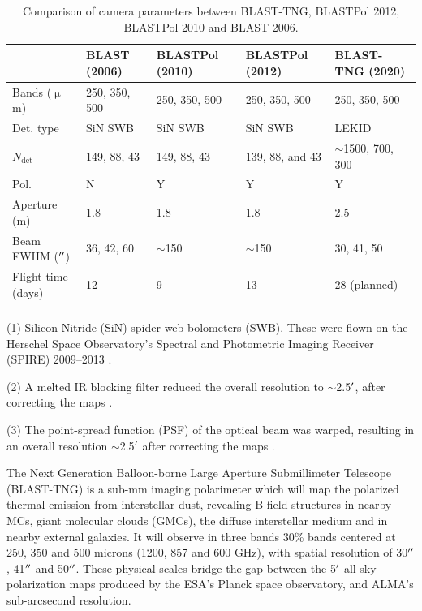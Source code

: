{\begin{table}
\begin{threeparttable}
\centering
\begin{adjustbox}{width=\textwidth}
\begin{tabular}{@{}lllll@{}}
\dtoprule
 & BLAST (2006) & BLASTPol (2010) & BLASTPol (2012) & BLAST-TNG (2020) \\ \midrule
Bands ($\upmu$m) & 250, 350, 500 & 250, 350, 500 & 250, 350, 500 & 250, 350, 500 \\
Det. type & SiN SWB\tnote{1} & SiN SWB & SiN SWB & LEKID \\
$N_{\mathrm{det}}$ & 149, 88, 43 & 149, 88, 43 & 139, 88, and 43 & $\sim$1500, 700, 300 \\
Pol. & N & Y & Y & Y \\
Aperture (m) & 1.8 & 1.8 & 1.8 & 2.5 \\
Beam FWHM ($\operatorname{^{\prime\prime}}$) & 36, 42, 60 & $\sim$150\tnote{2} & $\sim$150\tnote{3} & 30, 41, 50 \\
Flight time (days) & 12 & 9 & 13 & 28 (planned) \\ \dbottomrule
\end{tabular}
\end{adjustbox}
\begin{tablenotes}
\item (1) Silicon Nitride (SiN) spider web bolometers (SWB). These were flown on the Herschel Space Observatory's Spectral and Photometric Imaging Receiver (SPIRE) 2009--2013 \citep{griffin2003spire}.
\item (2) A melted IR blocking filter reduced the overall resolution to $\sim$2.5$\operatorname{^{\prime}}$, after correcting the maps \citep{matthews2014lupus}.
\item (3) The point-spread function (PSF) of the optical beam was warped, resulting in an overall resolution $\sim$2.5$\operatorname{^{\prime}}$ after correcting the maps \citep{fissel2016balloon}.
\end{tablenotes}
\caption{Comparison of camera parameters between BLAST-TNG, BLASTPol 2012, BLASTPol 2010 and BLAST 2006.}
\label{tab:blast_comp}
\end{threeparttable}
\end{table}

The Next Generation Balloon-borne Large Aperture Submillimeter Telescope (BLAST-TNG) is a sub-mm imaging polarimeter which will map the polarized thermal emission from interstellar dust, revealing B-field structures in nearby MCs, giant molecular clouds (GMCs), the diffuse interstellar medium and in nearby external galaxies. It will observe in three bands 30\% bands centered at 250, 350 and 500 microns (1200, 857 and 600 GHz), with spatial resolution of 30$\operatorname{^{\prime\prime}}$, 41$\operatorname{^{\prime\prime}}$ and 50$\operatorname{^{\prime\prime}}$. These physical scales bridge the gap between the 5$\operatorname{^{\prime}}$ all-sky polarization maps produced by the ESA's Planck space observatory, and ALMA's sub-arcsecond resolution.

}
